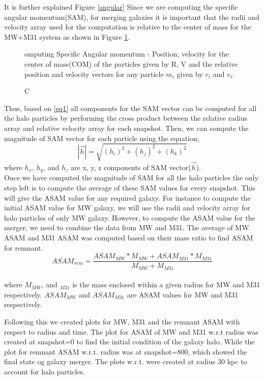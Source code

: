 \documentclass[twocolumn]{aastex631}
\begin{document}
It is further explained Figure \ref{angular} 
Since we are computing the specific angular momentum(SAM), for merging galaxies it is important that the radii and velocity array used for the computation is relative to the center of mass for the MW+M31 system as shown in Figure \ref{fig:ang_p}.\\

\begin{figure}[H]\label{angular}
\caption Computing Specific Angular momentum - Position, velocity for the center of mass(COM) of the particles given by R, V and the relative position and velocity vectors for any particle $m_{i}$ given by $r_{i}$ and $v_{i}$.
\label{fig:ang_p}
\end{figure}

Thus, based on \ref{eq1} all components for the SAM vector can be computed for all the halo particles by performing the cross product between the relative radius array and relative velocity array for each snapshot. Then, we can compute the magnitude of SAM vector for each particle using the equation,
\begin{equation}
|\vec{h}| = \sqrt{(h_{i})^2 + (h_{j})^2 + (h_{k})^2}
\end{equation}
where $h_{x}$, $h_{y}$, and $h_{z}$ are x, y, z components of SAM vector($\vec{h}$).\\
Once we have computed the magnitude of SAM for all the halo particles the only step left is to compute the average of these SAM values for every snapshot. This will give the ASAM value for any required galaxy. For instance to compute the initial ASAM value for MW galaxy, we will use the radii and velocity array for halo particles of only MW galaxy. However, to compute the ASAM value for the merger, we need to combine the data from MW and M31. The average of MW ASAM and M31 ASAM was computed based on their mass ratio to find ASAM for remnant. 
\begin{equation}
ASAM_{rem} = \frac{ASAM_{MW} * M_{MW} + ASAM_{M31} * M_{M31}}{M_{MW}+M_{M31}}
\end{equation} \\
where $M_{MW}$, and $_{M31}$ is the mass enclosed within a given radius for MW and M31 respectively. $ASAM_{MW}$ and $ASAM_{M31}$ are ASAM values for MW and M31 respectively.

Following this we created plots for MW, M31 and the remnant ASAM with respect to radius and time. The plot for ASAM of MW and M31 w.r.t radius was created at snapshot=0 to find the initial condition of the galaxy halo. While the plot for remnant ASAM w.r.t. radius was at snapshot=800, which showed the final state og galaxy merger. The plots w.r.t. were created at radius 30 kpc to account for halo particles.
\end{document}
